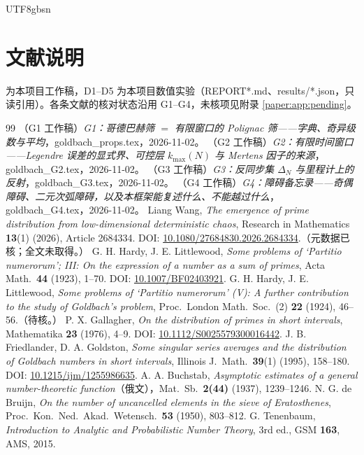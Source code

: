 \documentclass[11pt,a4paper]{article}
\theoremstyle{plain}
\theoremstyle{definition}
\begin{document}
\begin{CJK}{UTF8}{gbsn}
\section*{文献说明}
\cite{G1,G2,G3,G4} 为本项目工作稿，D1--D5 为本项目数值实验（REPORT*.md、results/*.json，只读引用）。各条文献的核对状态沿用 G1--G4，未核项见附录 \ref{paper:app:pending}。

\begin{thebibliography}{99}
 （G1 工作稿）\emph{G1：哥德巴赫筛 $=$ 有限窗口的 Polignac 筛——字典、奇异级数与平均}，goldbach\_props.tex，2026-11-02。
 （G2 工作稿）\emph{G2：有限时间窗口——Legendre 误差的显式界、可控层 $k_{\max}(N)$ 与 Mertens 因子的来源}，goldbach\_G2.tex，2026-11-02。
 （G3 工作稿）\emph{G3：反同步集 $\Delta_N$ 与里程计上的反射}，goldbach\_G3.tex，2026-11-02。
 （G4 工作稿）\emph{G4：障碍备忘录——奇偶障碍、二元次弧障碍，以及本框架能复述什么、不能越过什么}，goldbach\_G4.tex，2026-11-02。
 Liang Wang, \emph{The emergence of prime distribution from low-dimensional deterministic chaos},
Research in Mathematics \textbf{13}(1) (2026), Article 2684334. DOI: \url{10.1080/27684830.2026.2684334}.（元数据已核；全文未取得。）
 G. H. Hardy, J. E. Littlewood, \emph{Some problems of `Partitio numerorum'; III: On the expression of a number as a sum of primes},
Acta Math.\ \textbf{44} (1923), 1--70. DOI: \url{10.1007/BF02403921}.
 G. H. Hardy, J. E. Littlewood, \emph{Some problems of `Partitio numerorum' (V): A further contribution to the study of Goldbach's problem},
Proc.\ London Math.\ Soc.\ (2) \textbf{22} (1924), 46--56.（待核。）
 P. X. Gallagher, \emph{On the distribution of primes in short intervals}, Mathematika \textbf{23} (1976), 4--9. DOI: \url{10.1112/S0025579300016442}.
 J. B. Friedlander, D. A. Goldston, \emph{Some singular series averages and the distribution of Goldbach numbers in short intervals},
Illinois J.\ Math.\ \textbf{39}(1) (1995), 158--180. DOI: \url{10.1215/ijm/1255986635}.
 A. A. Buchstab, \emph{Asymptotic estimates of a general number-theoretic function}（俄文），Mat.\ Sb.\ \textbf{2(44)} (1937), 1239--1246.
 N. G. de Bruijn, \emph{On the number of uncancelled elements in the sieve of Eratosthenes}, Proc.\ Kon.\ Ned.\ Akad.\ Wetensch.\ \textbf{53} (1950), 803--812.
 G. Tenenbaum, \emph{Introduction to Analytic and Probabilistic Number Theory}, 3rd ed., GSM \textbf{163}, AMS, 2015.

\end{thebibliography}
\end{CJK}
\end{document}
